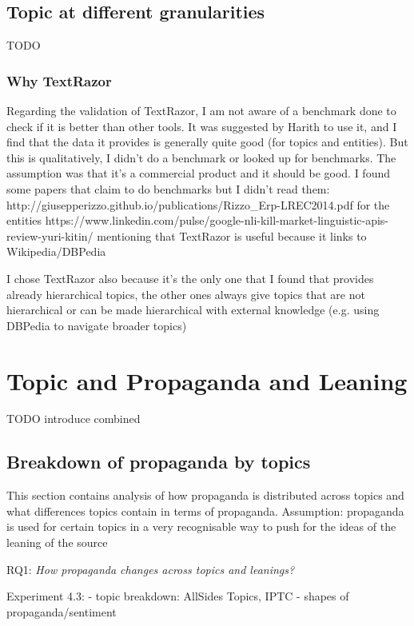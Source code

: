 \subsection{Topic at different granularities}

TODO

\subsubsection{Why TextRazor}
Regarding the validation of TextRazor, I am not aware of a benchmark done to check if it is better than other tools. It was suggested by Harith to use it, and I find that the data it provides is generally quite good (for topics and entities). But this is qualitatively, I didn’t do a benchmark or looked up for benchmarks. The assumption was that it’s a commercial product and it should be good.
I found some papers that claim to do benchmarks but I didn’t read them:
http://giusepperizzo.github.io/publications/Rizzo\_Erp-LREC2014.pdf for the entities
https://www.linkedin.com/pulse/google-nli-kill-market-linguistic-apis-review-yuri-kitin/ mentioning that TextRazor is useful because it links to Wikipedia/DBPedia

I chose TextRazor also because it’s the only one that I found that provides already hierarchical topics, the other ones always give topics that are not hierarchical or can be made hierarchical with external knowledge (e.g. using DBPedia to navigate broader topics)

\section{Topic and Propaganda and Leaning}

TODO introduce combined

\subsection{Breakdown of propaganda by topics}

This section contains analysis of how propaganda is distributed across topics and what differences topics contain in terms of propaganda.
Assumption: propaganda is used for certain topics in a very recognisable way to push for the ideas of the leaning of the source

RQ1: \emph{How propaganda changes across topics and leanings?}

Experiment 4.3: 
- topic breakdown: AllSides Topics, IPTC
- shapes of propaganda/sentiment



